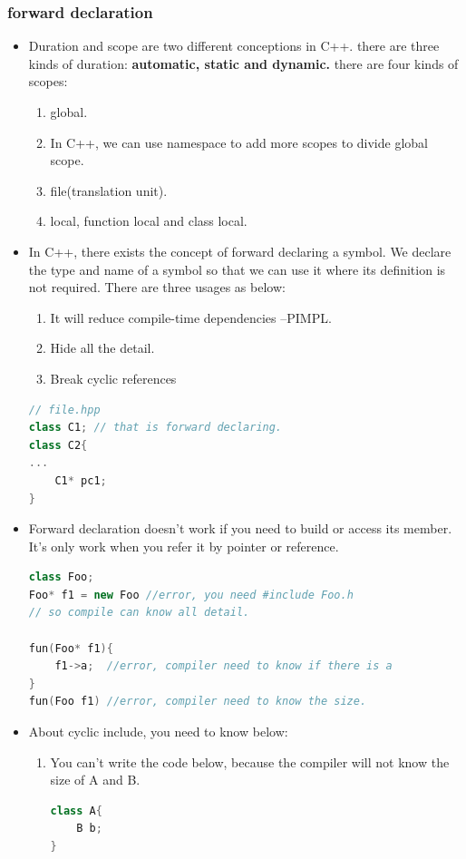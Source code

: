 \documentclass[a4paper,11pt,twoside]{book}
\begin{document}
\subsubsection{forward declaration}
\begin{itemize}
	
		\item Duration and scope are two different conceptions in C++. there are three kinds of duration: \textbf{automatic, static and dynamic.} there are four kinds of scopes:
	\begin{enumerate}
		\item global.
		\item In C++, we can use namespace to add more scopes to divide global scope.
		\item file(translation unit).
		\item local, function local and class local. 
	\end{enumerate}
	
	\item In C++, there exists the concept of forward declaring a symbol. We declare the type and name of a symbol so that we can use it where its definition is not required. There are three usages as below:
	\begin{enumerate}
		\item It will reduce compile-time dependencies --PIMPL.
		\item Hide all the detail. 
		\item Break cyclic references
	\end{enumerate}
	
\begin{lstlisting}[frame=single, language=c++]
// file.hpp
class C1; // that is forward declaring.
class C2{
...
	C1* pc1;
}
\end{lstlisting}
	
	\item Forward declaration doesn't work if you need to build or access its member. It's only work when you refer it by pointer or reference.
	
\begin{lstlisting}[frame=single, language=c++]
class Foo;
Foo* f1 = new Foo //error, you need #include Foo.h
// so compile can know all detail.
	
fun(Foo* f1){
	f1->a;  //error, compiler need to know if there is a 
}
fun(Foo f1) //error, compiler need to know the size.
\end{lstlisting}
	
	\item About cyclic include, you need to know below:
	\begin{enumerate}
		\item You can't write the code below, because the compiler will not know the size of A and B. 
\begin{lstlisting}[frame=single, language=c++]
class A{
	B b;
}


\end{lstlisting}
\end{enumerate}
\end{itemize}
\end{document}
